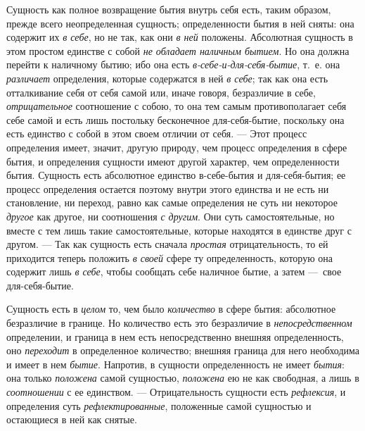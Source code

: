 Сущность как полное возвращение бытия внутрь себя есть, таким образом,
прежде всего неопределенная сущность; определенности бытия в ней сняты: она
содержит их {\em в себе}, но не так, как они
{\em в ней} положены. Абсолютная сущность в этом
простом единстве с собой {\em не обладает наличным
бытием}. Но она должна перейти к наличному бытию; ибо она есть
{\em в-себе-и-для-себя-бытие}, т.~е. она
{\em различает} определения, которые содержатся в ней
{\em в себе}; так как она есть отталкивание себя от
себя самой или, иначе говоря, безразличие в себе,
{\em отрицательное} соотношение с собою, то она тем
самым противополагает себя себе самой и есть лишь постольку бесконечное
для-себя-бытие, поскольку она есть единство с собой в этом своем отличии от
себя. — Этот процесс определения имеет, значит, другую природу, чем процесс
определения в сфере бытия, и определения сущности имеют другой характер,
чем определенности бытия. Сущность есть абсолютное единство в-себе-бытия и
для-себя-бытия; ее процесс определения остается поэтому внутри этого
единства и не есть ни становление, ни переход, равно как самые определения
не суть ни некоторое {\em другое} как другое, ни
соотношения {\em с другим}. Они суть самостоятельные,
но вместе с тем лишь такие самостоятельные, которые находятся в единстве
друг с другом. — Так как сущность есть сначала
{\em простая} отрицательность, то ей приходится теперь
положить {\em в своей} сфере ту определенность, которую
она содержит лишь {\em в себе}, чтобы сообщать себе
наличное бытие, а затем —~свое для-себя-бытие.

Сущность есть в {\em целом} то, чем было
{\em количество} в сфере бытия: абсолютное безразличие
в границе. Но количество есть это безразличие в
{\em непосредственном} определении, и граница в нем
есть непосредственно внешняя определенность, оно
{\em переходит} в определенное количество; внешняя
граница для него необходима и имеет в нем {\em бытие}.
Напротив, в сущности определенность не имеет
{\em бытия}: она только
{\em положена} самой сущностью,
{\em положена} ею не как свободная, а лишь в
{\em соотношении} с ее единством. — Отрицательность
сущности есть {\em рефлексия}, и определения суть
{\em рефлектированные}, положенные самой сущностью и
остающиеся в ней как снятые.

